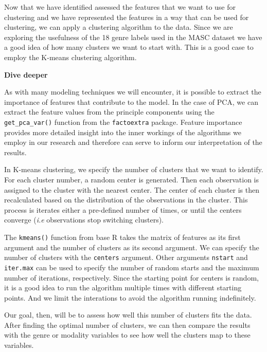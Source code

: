 \documentclass[
  letterpaper,
  DIV=11,
  numbers=noendperiod]{scrreprt}
\theoremstyle{definition}
\theoremstyle{remark}
\begin{document}
Now that we have identified assessed the features that we want to use
for clustering and we have represented the features in a way that can be
used for clustering, we can apply a clustering algorithm to the data.
Since we are exploring the usefulness of the 18 genre labels used in the
MASC dataset we have a good idea of how many clusters we want to start
with. This is a good case to employ the K-means clustering algorithm.

\begin{tcolorbox}[enhanced jigsaw, leftrule=.75mm, colframe=quarto-callout-color-frame, colback=white, rightrule=.15mm, opacityback=0, arc=.35mm, breakable, bottomrule=.15mm, left=2mm, toprule=.15mm]

\textbf{ Dive deeper}

As with many modeling techniques we will encounter, it is possible to
extract the importance of features that contribute to the model. In the
case of PCA, we can extract the feature values from the principle
components using the \texttt{get\_pca\_var()} function from the
\texttt{factoextra} package. Feature importance provides more detailed
insight into the inner workings of the algorithms we employ in our
research and therefore can serve to inform our interpretation of the
results.

\end{tcolorbox}

In K-means clustering, we specify the number of clusters that we want to
identify. For each cluster number, a random center is generated. Then
each observation is assigned to the cluster with the nearest center. The
center of each cluster is then recalculated based on the distribution of
the observations in the cluster. This process is iterates either a
pre-defined number of times, or until the centers converge (\emph{i.e}
observations stop switching clusters).

The \texttt{kmeans()} function from base R takes the matrix of features
as its first argument and the number of clusters as its second argument.
We can specify the number of clusters with the \texttt{centers}
argument. Other arguments \texttt{nstart} and \texttt{iter.max} can be
used to specify the number of random starts and the maximum number of
iterations, respectively. Since the starting point for centers is
random, it is a good idea to run the algorithm multiple times with
different starting points. And we limit the interations to avoid the
algorithm running indefinitely.

Our goal, then, will be to assess how well this number of clusters fits
the data. After finding the optimal number of clusters, we can then
compare the results with the genre or modality variables to see how well
the clusters map to these variables.
\end{document}
